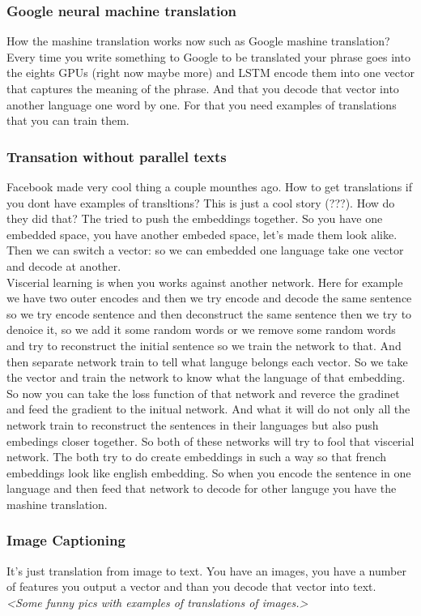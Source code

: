 \subsubsection*{Google neural machine translation}

How the mashine translation works now such as Google mashine translation? Every time you write something to Google to be translated your phrase goes into the eights GPUs (right now maybe more) and LSTM encode them into one vector that captures the meaning of the phrase. And that you decode that vector into another language one word by one. For that you need examples of translations that you can train them.

\subsubsection*{Transation without parallel texts}

Facebook made very cool thing a couple mounthes ago. How to get translations if you dont have examples of transltions? This is just a cool story (???). How do they did that? The tried to push the embeddings together. So you have one embedded space, you have another embeded space, let's made them look alike. Then we can switch a vector: so we can  embedded one language take one vector and decode at another.\\
Viscerial learning is when you works against another network. Here for example we have two outer encodes and then we try encode and decode the same sentence so we try encode sentence and then deconstruct the same sentence then we try to denoice it, so we add it some random words or we remove some random words and try to reconstruct the initial sentence so we train the network to that. And then separate network train to tell what languge belongs each vector. So we take the vector and train the network to know what the language of that embedding. So now you can take the loss function of that network and reverce the gradinet and feed the gradient to the initual network. And what it will do not only all the network train to reconstruct the sentences in their languages but also push embedings closer together. So both of these networks will try to fool that viscerial network. The both try to do create embeddings in such a way so that french embeddings look like english embedding. So when you encode the sentence in one language and then feed that network to decode for other languge you have the mashine translation.

\subsubsection*{Image Captioning}

It's just translation from image to text. You have an images, you have a number of features you output a vector and than you decode that vector into text.\\
{\it <Some funny pics with examples of translations of images.>}